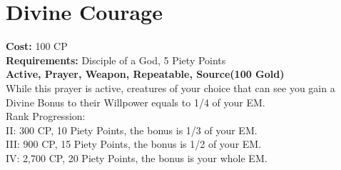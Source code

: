 \section{Divine Courage}\label{prayer:divineCourage}
\textbf{Cost:} 100 CP\\
\textbf{Requirements:} Disciple of a God, 5 Piety Points \\
\textbf{Active, Prayer, Weapon, Repeatable, Source(100 Gold)}\\
While this prayer is active, creatures of your choice that can see you gain a Divine Bonus to their Willpower equals to 1/4 of your EM.
\\
Rank Progression:\\
II: 300 CP, 10 Piety Points, the bonus is 1/3 of your EM.\\
III: 900 CP, 15 Piety Points, the bonus is 1/2 of your EM.\\
IV: 2,700 CP, 20 Piety Points, the bonus is your whole EM.\\